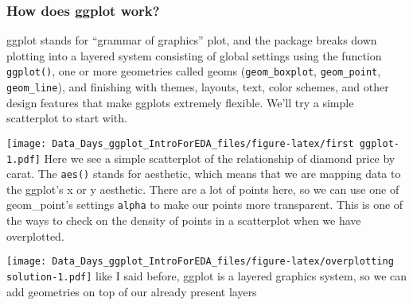 \documentclass[
]{article}
\newenvironment{Shaded}{\begin{snugshade}}{\end{snugshade}}
\newcommand{\CommentTok}[1]{\textcolor[rgb]{0.56,0.35,0.01}{\textit{#1}}}
\newcommand{\DataTypeTok}[1]{\textcolor[rgb]{0.13,0.29,0.53}{#1}}
\newcommand{\FloatTok}[1]{\textcolor[rgb]{0.00,0.00,0.81}{#1}}
\newcommand{\KeywordTok}[1]{\textcolor[rgb]{0.13,0.29,0.53}{\textbf{#1}}}
\newcommand{\NormalTok}[1]{#1}
\newcommand{\OperatorTok}[1]{\textcolor[rgb]{0.81,0.36,0.00}{\textbf{#1}}}
\newcommand{\StringTok}[1]{\textcolor[rgb]{0.31,0.60,0.02}{#1}}
\begin{document}
\hypertarget{how-does-ggplot-work}{%
\subsubsection{How does ggplot work?}\label{how-does-ggplot-work}}

ggplot stands for ``grammar of graphics'' plot, and the package breaks
down plotting into a layered system consisting of global settings using
the function \texttt{ggplot()}, one or more geometries called geoms
(\texttt{geom\_boxplot}, \texttt{geom\_point}, \texttt{geom\_line}), and
finishing with themes, layouts, text, color schemes, and other design
features that make ggplots extremely flexible. We'll try a simple
scatterplot to start with.

\begin{Shaded}
\end{Shaded}

\texttt{[image: Data\_Days\_ggplot\_IntroForEDA\_files/figure-latex/first ggplot-1.pdf]}
Here we see a simple scatterplot of the relationship of diamond price by
carat. The \texttt{aes()} stands for aesthetic, which means that we are
mapping data to the ggplot's x or y aesthetic. There are a lot of points
here, so we can use one of geom\_point's settings \texttt{alpha} to make
our points more transparent. This is one of the ways to check on the
density of points in a scatterplot when we have overplotted.

\begin{Shaded}
\end{Shaded}

\texttt{[image: Data\_Days\_ggplot\_IntroForEDA\_files/figure-latex/overplotting solution-1.pdf]}
like I said before, ggplot is a layered graphics system, so we can add
geometries on top of our already present layers
\end{document}
